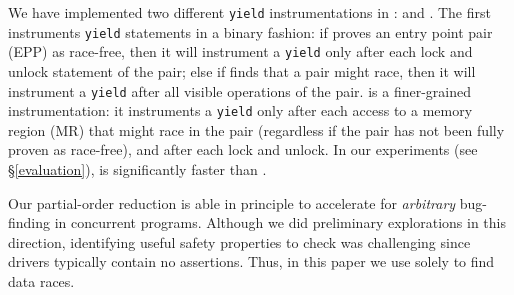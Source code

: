 We have implemented two different \texttt{yield} instrumentations in \whoop: \yieldcoarse and \yieldmr.
%
The first instruments \texttt{yield} statements in a binary fashion: if \whoop proves an entry point pair (EPP) as race-free, then it will instrument a \texttt{yield} only after each lock and unlock statement of the pair; else if \whoop finds that a pair might race, then it will instrument a \texttt{yield} after all visible operations of the pair.
%
\yieldmr is a finer-grained instrumentation: it instruments a \texttt{yield} only after each access to a memory region (MR) that might race in the pair (regardless if the pair has not been fully proven as race-free), and after each lock and unlock. In our experiments (see \S\ref{evaluation}), \yieldmr is significantly faster than \yieldcoarse.

Our partial-order reduction is able in principle to accelerate \corral for \emph{arbitrary} bug-finding in concurrent programs. Although we did preliminary explorations in this direction, identifying useful safety properties to check was challenging since drivers typically contain no assertions. Thus, in this paper we use \corral solely to find data races.
